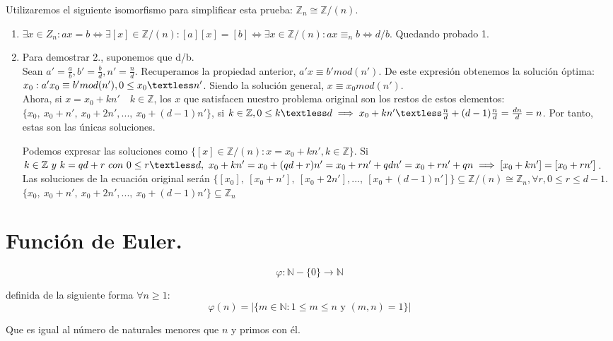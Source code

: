 \documentclass[11pt, a4paper, titlepage]{article}
\makeatletter
\renewenvironment{proof}[1][\proofname] {\vspace{-15pt}\par\pushQED{\qed}\normalfont\topsep6\p@\@plus6\p@\relax\trivlist\item[\hskip\labelsep\it#1\@addpunct{.}]\ignorespaces}{\popQED\endtrivlist\@endpefalse}
\providecommand{\ent}{\mathbb{Z}}
\theoremstyle{theorem-style}
\theoremstyle{definition-style}
\theoremstyle{remark-style}
\theoremstyle{example-style}
\makeatother
\begin{document}
\begin{proof}
Utilizaremos el siguiente isomorfismo para simplificar esta prueba: $\ent_n \cong \ent/(n)$.\\
\begin{enumerate}
	\item $\exists x \in Z_n :  ax = b \iff \exists[x] \in \ent/(n) : [a][x] = [b] \iff \exists x \in \ent /(n) : ax \equiv_n b \iff d/b$. Quedando probado 1.
	\item  Para demostrar 2., suponemos que d/b.\\
	 Sean $a' = \frac{a}{b}, b' = \frac{b}{d}, n' = \frac{n}{d}$. Recuperamos la propiedad anterior, $a'x \equiv b'mod(n')$. De este expresión obtenemos la solución óptima: $x_0 : a'x_0 \equiv b'mod(n'), 0 \le x_0 \textless n'$. Siendo la solución general, $x \equiv x_0 mod(n')$.\\
Ahora, si $x = x_0 + kn' \quad k \in \ent$, los $x$ que satisfacen nuestro problema original son los restos de estos elementos:\quad $\{x_0,\ x_0 + n',\ x_0 +2n',...,\ x_0 + (d-1)n'\}$, si $k \in \ent, 0 \le k \textless d \implies x_0 + kn' \textless \frac{n}{d} + (d-1)\frac{n}{d} = \frac{dn}{d} = n$. Por tanto, estas son las únicas soluciones.

Podemos expresar las soluciones como $\{ [x] \in \ent /(n) : x = x_0 + kn', k \in \ent\}$. Si $k \in \ent \ y \ k = qd + r \ con \ 0 \le r \textless d, \ x_0 + kn' = x_0 + (qd + r)n' = x_0 + rn' + qdn'= x_0 + rn' +qn \implies [x_0 + kn'] = [x_0 + rn']$. Las soluciones de la ecuación original serán $\{[x_0],\ [x_0 + n'],\ [x_0 +2n'],...,\ [x_0 + (d-1)n']\} \subseteq \ent /(n) \cong \ent _n, \forall r, 0 \le r \le d - 1.$
$\{x_0,\ x_0 + n',\ x_0 +2n',...,\ x_0 + (d-1)n'\} \subseteq \ent _n$
\end{enumerate}
	
	
	
\end{proof}

\section{Función de Euler.}
\[
  \varphi : \mathbb{N}-\{0\} \longrightarrow \mathbb{N}  
\]

definida de la siguiente forma $\forall n\ge 1$:
\[
  \varphi(n) = |\{m\in \mathbb{N} : 1\le m \le n \text{ y } (m,n)=1\}|
\]

Que es igual al número de naturales menores que $n$ y primos con él.
\end{document}
